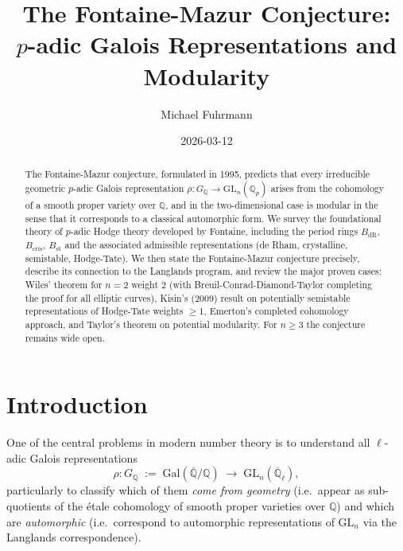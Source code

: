\documentclass[12pt,a4paper]{amsart}
\theoremstyle{definition}
\theoremstyle{remark}
\newcommand{\Gal}{\mathrm{Gal}}
\newcommand{\GL}{\mathrm{GL}}
\newcommand{\Qp}{\mathbb{Q}_p}
\newcommand{\Qbar}{\overline{\mathbb{Q}}}
\newcommand{\GQ}{G_{\mathbb{Q}}}
\newcommand{\BdR}{B_{\mathrm{dR}}}
\newcommand{\Bcris}{B_{\mathrm{cris}}}
\newcommand{\Bst}{B_{\mathrm{st}}}
\newcommand{\Q}{\mathbb{Q}}
\begin{document}

\title{The Fontaine-Mazur Conjecture:\\
  $p$-adic Galois Representations and Modularity}

\author{Michael Fuhrmann}
\address{Specialist Mathematics Project, Build 167}
\date{2026-03-12}

\begin{abstract}
The Fontaine-Mazur conjecture, formulated in 1995, predicts that every irreducible
geometric $p$-adic Galois representation
$\rho\colon \GQ \to \GL_n(\Qp)$
arises from the cohomology of a smooth proper variety over $\Q$, and in the two-dimensional
case is modular in the sense that it corresponds to a classical automorphic form.
We survey the foundational theory of $p$-adic Hodge theory developed by Fontaine,
including the period rings $\BdR$, $\Bcris$, $\Bst$ and the associated admissible
representations (de Rham, crystalline, semistable, Hodge-Tate).
We then state the Fontaine-Mazur conjecture precisely, describe its connection to the
Langlands program, and review the major proven cases:
Wiles' theorem for $n=2$ weight $2$ (with Breuil-Conrad-Diamond-Taylor completing the
proof for all elliptic curves), Kisin's (2009) result on potentially semistable
representations of Hodge-Tate weights $\geq 1$, Emerton's completed cohomology approach,
and Taylor's theorem on potential modularity.
For $n \geq 3$ the conjecture remains wide open.
\end{abstract}

\maketitle

\tableofcontents

\section{Introduction}

One of the central problems in modern number theory is to understand all
$\ell$-adic Galois representations
\[
  \rho \colon \GQ \;:=\; \Gal(\Qbar/\Q) \;\longrightarrow\; \GL_n(\overline{\Q}_\ell),
\]
particularly to classify which of them \emph{come from geometry} (i.e.\ appear as
sub-quotients of the étale cohomology of smooth proper varieties over $\Q$) and which
are \emph{automorphic} (i.e.\ correspond to automorphic representations of $\GL_n$ via
the Langlands correspondence).
\end{document}
